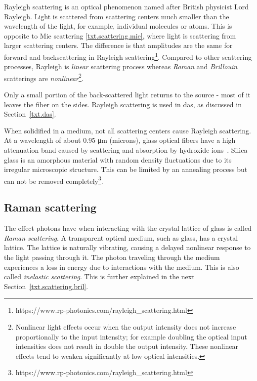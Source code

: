 Rayleigh scattering is an optical phenomenon named after British physicist Lord Rayleigh. Light is scattered from scattering centers much smaller than the wavelength of the light, for example, individual molecules or atoms. This is opposite to Mie scattering \ref{txt.scattering.mie}, where light is scattering from larger scattering centers. The difference is that amplitudes are the same for forward and backscattering in Rayleigh scattering\footnote{https://www.rp-photonics.com/rayleigh\_scattering.html}. Compared to other scattering processes, Rayleigh is \textit{linear} scattering process whereas \textit{Raman} and \textit{Brillouin} scatterings are \textit{nonlinear}\footnote{Nonlinear light effects occur when the output intensity does not increase proportionally to the input intensity; for example doubling the optical input intensities does not result in double the output intensity. These nonlinear effects tend to weaken significantly at low optical intensities.}.

Only a small portion of the back-scattered light returns to the source - most of it leaves the fiber on the sides. Rayleigh scattering is used in \ac{das}, as discussed in Section~\ref{txt.das}.

When solidified in a medium, not all scattering centers cause Rayleigh scattering. At a wavelength of about 0.95 μm (microns), glass optical fibers have a high attenuation band caused by scattering and absorption by hydroxide ions~\cite{scatteringcenterbook}. Silica glass is an amorphous material with random density fluctuations due to its irregular microscopic structure. This can be limited by an annealing process but can not be removed completely\footnote{https://www.rp-photonics.com/rayleigh\_scattering.html}.




\subsection{Raman scattering}\label{txt.scattering.ram}

The effect photons have when interacting with the crystal lattice of glass is called \textit{Raman scattering}. A transparent optical medium, such as glass, has a crystal lattice. The lattice is naturally vibrating, causing a delayed nonlinear response to the light passing through it. The photon traveling through the medium experiences a loss in energy due to interactions with the medium. This is also called \textit{inelastic scattering}. This is further explained in the next Section~\ref{txt.scattering.bril}.

